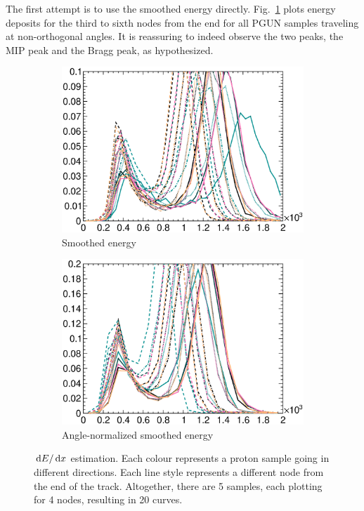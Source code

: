 	The first attempt is to use the smoothed energy directly. 
	Fig.~\ref{subfig:esc-smooth-e} plots energy deposits for the third to sixth nodes from the end for all PGUN samples traveling at non-orthogonal angles.
	It is reassuring to indeed observe the two peaks, the MIP peak and the Bragg peak, as hypothesized. 
  \begin{figure}
        \centering
        \begin{subfigure}[b]{\dbfigwid\textwidth}
             \centering
             \includegraphics[width=\textwidth]{figures/sel/dedx5_pdf_skew_smooth.eps}
             \caption{Smoothed energy}
             \label{subfig:esc-smooth-e}
        \end{subfigure}
        \begin{subfigure}[b]{\dbfigwid\textwidth}
             \centering
             \includegraphics[width=\textwidth]{figures/sel/an_dedx5_pdf_skew_smooth_angnorm.eps}
             \caption{Angle-normalized smoothed energy}
             \label{subfig:esc-an-smooth-e}
        \end{subfigure}
        \caption{$\,\textrm{d}E/\,\textrm{d}x$ estimation. Each colour represents a proton sample going in different directions. Each line style represents a different node from the end of the track. Altogether, there are 5 samples, each plotting for 4 nodes, resulting in 20 curves.}
        \label{fig:esc-angnorm}
  \end{figure}
